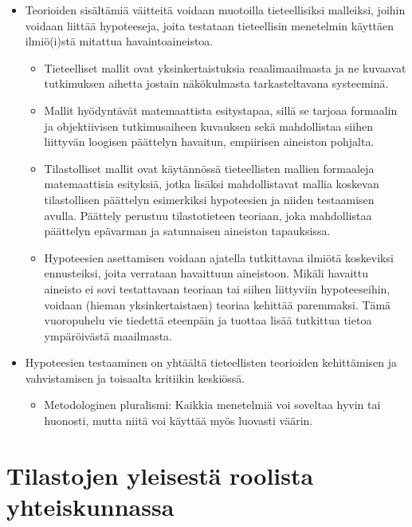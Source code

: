 \documentclass[
]{book}
\providecommand{\tightlist}{%
  \setlength{\itemsep}{0pt}\setlength{\parskip}{0pt}}
\begin{document}
\hfill\break
\hfill\break

\begin{itemize}
\tightlist
\item
  Teorioiden sisältämiä väitteitä voidaan muotoilla tieteellisiksi malleiksi, joihin voidaan liittää hypoteeseja, joita testataan tieteellisin menetelmin käyttäen ilmiö(i)stä mitattua havaintoaineistoa.

  \begin{itemize}
  \tightlist
  \item
    Tieteelliset mallit ovat yksinkertaistuksia reaalimaailmasta ja ne kuvaavat tutkimuksen aihetta jostain näkökulmasta tarkasteltavana systeeminä.
  \item
    Mallit hyödyntävät matemaattista esitystapaa, sillä se tarjoaa formaalin ja objektiivisen tutkimusaiheen kuvauksen sekä mahdollistaa siihen liittyvän loogisen päättelyn havaitun, empiirisen aineiston pohjalta.
  \item
    Tilastolliset mallit ovat käytännössä tieteellisten mallien formaaleja matemaattisia esityksiä, jotka lisäksi mahdollistavat mallia koskevan tilastollisen päättelyn esimerkiksi hypoteesien ja niiden
    testaamisen avulla. Päättely perustuu tilastotieteen teoriaan, joka mahdollistaa päättelyn epävarman ja satunnaisen aineiston tapauksissa.
  \item
    Hypoteesien asettamisen voidaan ajatella tutkittavaa ilmiötä koskeviksi ennusteiksi, joita verrataan havaittuun aineistoon. Mikäli havaittu aineisto ei sovi testattavaan teoriaan tai siihen liittyviin hypoteeseihin, voidaan (hieman yksinkertaistaen) teoriaa kehittää paremmaksi. Tämä vuoropuhelu vie tiedettä eteenpäin ja tuottaa lisää tutkittua tietoa ympäröivästä maailmasta.
  \end{itemize}
\item
  Hypoteesien testaaminen on yhtäältä tieteellisten teorioiden kehittämisen ja vahvistamisen ja toisaalta kritiikin keskiössä.

  \begin{itemize}
  \tightlist
  \item
    Metodologinen pluralismi: Kaikkia menetelmiä voi soveltaa hyvin tai huonosti, mutta niitä voi käyttää myös luovasti väärin.
  \end{itemize}
\end{itemize}

\hypertarget{alaluku23}{%
\section{Tilastojen yleisestä roolista yhteiskunnassa}\label{alaluku23}}
\end{document}
